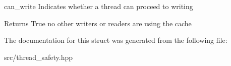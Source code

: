 can\+\_\+write Indicates whether a thread can proceed to writing 

\begin{DoxyReturn}{Returns}
True no other writers or readers are using the cache 
\end{DoxyReturn}


The documentation for this struct was generated from the following file\+:\begin{DoxyCompactItemize}
\item 
src/thread\+\_\+safety.\+hpp\end{DoxyCompactItemize}
